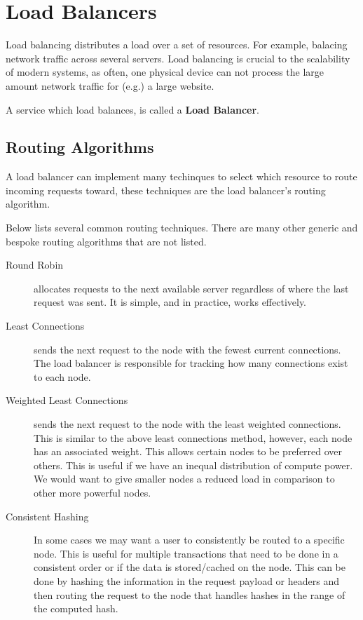 \documentclass{csse4400}
\begin{document}
\section{Load Balancers}

Load balancing distributes a load over a set of resources.
For example, balacing network traffic across several servers.
Load balancing is crucial to the scalability of modern systems, as often, one physical device can not process the large amount network traffic for (e.g.) a large website.

A service which load balances, is called a \textbf{Load Balancer}.


\subsection{Routing Algorithms}

A load balancer can implement many techinques to select which resource to route incoming requests toward, these techniques are the load balancer's routing algorithm.

Below lists several common routing techniques.
There are many other generic and bespoke routing algorithms that are not listed.

\begin{description}
  \item[Round Robin] allocates requests to the next available server regardless of where the last request was sent.
      It is simple, and in practice, works effectively.
  \item[Least Connections] sends the next request to the node with the fewest current connections.
      The load balancer is responsible for tracking how many connections exist to each node.
  \item[Weighted Least Connections] sends the next request to the node with the least weighted connections. This is similar to the above least connections method, however, each node has an associated weight.
      This allows certain nodes to be preferred over others.
      This is useful if we have an inequal distribution of compute power.
      We would want to give smaller nodes a reduced load in comparison to other more powerful nodes.
  \item[Consistent Hashing] In some cases we may want a user to consistently be routed to a specific node.
      This is useful for multiple transactions that need to be done in a consistent order or if the data is stored/cached on the node.
      This can be done by hashing the information in the request payload or headers and then routing the request to the node that handles hashes in the range of the computed hash.
\end{description}
\end{document}
